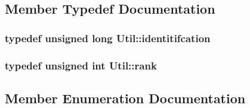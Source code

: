 \subsection{Member Typedef Documentation}
\subsubsection[{\texorpdfstring{identitifcation}{identitifcation}}]{\setlength{\rightskip}{0pt plus 5cm}typedef unsigned long {\bf Util\+::identitifcation}}\hypertarget{class_util_ad17d458d9344b10bba64347e514d6d71}{}\label{class_util_ad17d458d9344b10bba64347e514d6d71}
\subsubsection[{\texorpdfstring{rank}{rank}}]{\setlength{\rightskip}{0pt plus 5cm}typedef unsigned int {\bf Util\+::rank}}\hypertarget{class_util_a2a402b3a3a889d699bb3a1a87cbe6d1e}{}\label{class_util_a2a402b3a3a889d699bb3a1a87cbe6d1e}


\subsection{Member Enumeration Documentation}
